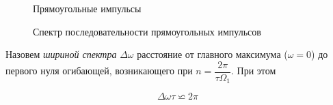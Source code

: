 \documentclass[a4paper, 12pt]{article}
\begin{document}
                \begin{figure}[ht]
                    \begin{minipage}[ht]{0.45\linewidth}
                        \caption{Прямоугольные импульсы}
                    \end{minipage}
                    \begin{minipage}[ht]{0.45\linewidth}
                        \caption{Спектр последовательности прямоугольных импульсов}
                    \end{minipage}
                \end{figure}

                Назовем \textit{шириной спектра} $\Delta \omega$ расстояние от главного максимума ($\omega =0$) до первого нуля огибающей, возникающего при $n=\dfrac{2\pi}{\tau \Omega_{1}}$. При этом

                $$\Delta \omega \tau \backsimeq 2 \pi $$
\end{document}
